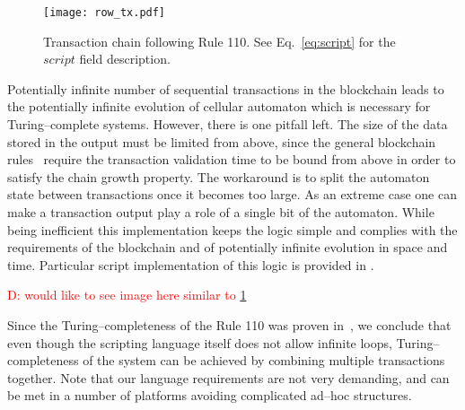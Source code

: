 \documentclass[runningheads]{llncs}
\newcommand{\dnote}[1]{\textcolor{red}{D: {#1}}}
\newcommand{\vk}[1]{\textcolor{blue}{V: {#1}}}
\newcommand{\payload}{\textit{payload}}
\newcommand{\script}{\textit{script}}
\begin{document}
    \begin{figure}[h]
        \centering
        \texttt{[image: row\_tx.pdf]}
        \caption{Transaction chain following Rule 110. See Eq.~\ref{eq:script} for the
            $script$ field description.
        \label{fig:txs} }
    \end{figure}

    Potentially infinite number of sequential transactions in the
    blockchain leads to the potentially infinite evolution of cellular
    automaton which is necessary for Turing--complete systems.
    However, there is one pitfall left.
    The size of the data stored in the output must be limited from above, since
    the general blockchain rules~\cite{garay2015bitcoin} require the transaction validation
    time to be bound from above in order to satisfy the
    chain growth property. The workaround is to split
    the automaton state between transactions once it becomes too large. As an
    extreme case one can make a transaction output play a role of a single bit
    of the automaton. While being inefficient this implementation keeps
    the logic simple and complies with the requirements of the blockchain and
    of potentially infinite evolution in space and time. Particular script
    implementation of this logic is provided in .

    \dnote{would like to see image here similar to \ref{fig:txs}}

    Since the Turing--completeness of the Rule 110 was proven
    in~\cite{cook2004universality}, we conclude that even though the scripting
    language itself does not allow infinite loops, Turing--completeness of the
    system can be achieved by combining multiple transactions together. Note
    that our language requirements are not very demanding, and can be met in a
    number of platforms avoiding complicated ad--hoc structures.
\end{document}
